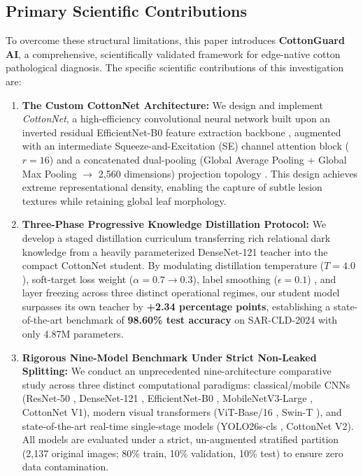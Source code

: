 \documentclass[journal,10pt,twocolumn]{IEEEtran}
\begin{document}
\subsection{Primary Scientific Contributions}
To overcome these structural limitations, this paper introduces \textbf{CottonGuard AI}, a comprehensive, scientifically validated framework for edge-native cotton pathological diagnosis. The specific scientific contributions of this investigation are:
\begin{enumerate}[leftmargin=*]
    \item \textbf{The Custom CottonNet Architecture:} We design and implement \textit{CottonNet}, a high-efficiency convolutional neural network built upon an inverted residual EfficientNet-B0 feature extraction backbone \cite{sandler2018mobilenetv2, tan2019efficientnet}, augmented with an intermediate Squeeze-and-Excitation (SE) channel attention block ($r=16$) \cite{hu2020squeeze} and a concatenated dual-pooling (Global Average Pooling + Global Max Pooling $\rightarrow$ 2,560 dimensions) projection topology \cite{woo2018cbam}. This design achieves extreme representational density, enabling the capture of subtle lesion textures while retaining global leaf morphology.
    \item \textbf{Three-Phase Progressive Knowledge Distillation Protocol:} We develop a staged distillation curriculum transferring rich relational dark knowledge from a heavily parameterized DenseNet-121 teacher \cite{huang2017densely} into the compact CottonNet student. By modulating distillation temperature ($T=4.0$), soft-target loss weight ($\alpha=0.7 \rightarrow 0.3$), label smoothing ($\epsilon=0.1$) \cite{szegedy2016rethinking}, and layer freezing across three distinct operational regimes, our student model surpasses its own teacher by \textbf{+2.34 percentage points}, establishing a state-of-the-art benchmark of \textbf{98.60\% test accuracy} on SAR-CLD-2024 with only 4.87M parameters.
    \item \textbf{Rigorous Nine-Model Benchmark Under Strict Non-Leaked Splitting:} We conduct an unprecedented nine-architecture comparative study across three distinct computational paradigms: classical/mobile CNNs (ResNet-50 \cite{he2016deep}, DenseNet-121 \cite{huang2017densely}, EfficientNet-B0 \cite{tan2019efficientnet}, MobileNetV3-Large \cite{howard2019searching}, CottonNet V1), modern visual transformers (ViT-Base/16 \cite{dosovitskiy2021image}, Swin-T \cite{liu2021swin}), and state-of-the-art real-time single-stage models (YOLO26s-cls \cite{jocher2023yolo}, CottonNet V2). All models are evaluated under a strict, un-augmented stratified partition (2,137 original images; 80\% train, 10\% validation, 10\% test) to ensure zero data contamination.

\end{enumerate}
\end{document}
